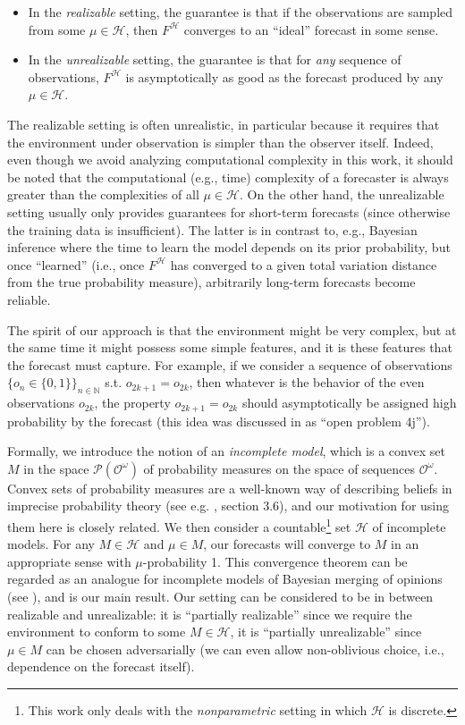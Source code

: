 \documentclass[11pt]{article}
\theoremstyle{definition}
\theoremstyle{plain}
\newcommand{\Nats}{\mathbb{N}}
\newcommand{\PM}{\mathcal{P}}
\newcommand{\Ob}{\mathcal{O}}
\newcommand{\OO}{\Ob^\omega}
\newcommand{\PMO}{\PM(\OO)}
\newcommand{\MC}{\mathcal{H}}
\begin{document}
\begin{itemize}
\item 
In the \emph{realizable} setting, the guarantee is that if the observations are sampled from some $\mu \in \MC$, then $F^\MC$ converges to an \enquote{ideal} forecast in some sense.
\item
In the \emph{unrealizable} setting, the guarantee is that for \emph{any} sequence of observations, $F^\MC$ is asymptotically as good as the forecast produced by any $\mu \in \MC$.
\end{itemize}

The realizable setting is often unrealistic, in particular because it requires that the environment under observation is simpler than the observer itself. Indeed, even though we avoid analyzing computational complexity in this work, it should be noted that the computational (e.g., time) complexity of a forecaster is always greater than the complexities of all $\mu \in \MC$. On the other hand, the unrealizable setting usually only provides guarantees for short-term forecasts (since otherwise the training data is insufficient). The latter is in contrast to, e.g., Bayesian inference where the time to learn the model depends on its prior probability, but once \enquote{learned} (i.e., once $F^\MC$ has converged to a given total variation distance from the true probability measure), arbitrarily long-term forecasts become reliable.

The spirit of our approach is that the environment might be very complex, but at the same time it might possess some simple features, and it is these features that the forecast must capture. For example, if we consider a sequence of observations $\{o_n \in \{0,1\}\}_{n \in \Nats}$ s.t. $o_{2k+1}=o_{2k}$, then whatever is the behavior of the even observations $o_{2k}$, the property $o_{2k+1}=o_{2k}$ should asymptotically be assigned high probability by the forecast (this idea was discussed in \cite{Hutter_2009} as \enquote{open problem 4j}).

Formally, we introduce the notion of an \emph{incomplete model}, which is a convex set $M$ in the space $\PMO$ of probability measures on the space of sequences $\OO$. Convex sets of probability measures are a well-known way of describing beliefs in imprecise probability theory (see e.g. \cite{Walley_1991}, section 3.6), and our motivation for using them here is closely related. We then consider a countable\footnote{This work only deals with the \emph{nonparametric} setting in which $\MC$ is discrete.} set $\MC$ of incomplete models. For any $M \in \MC$ and $\mu \in M$, our forecasts will converge to $M$ in an appropriate sense with $\mu$-probability 1. This convergence theorem can be regarded as an analogue for incomplete models of Bayesian merging of opinions (see \cite{Blackwell_1962}), and is our main result. Our setting can be considered to be in between realizable and unrealizable: it is \enquote{partially realizable} since we require the environment to conform to some $M \in \MC$, it is \enquote{partially unrealizable} since $\mu \in M$ can be chosen adversarially (we can even allow non-oblivious choice, i.e., dependence on the forecast itself).
\end{document}
